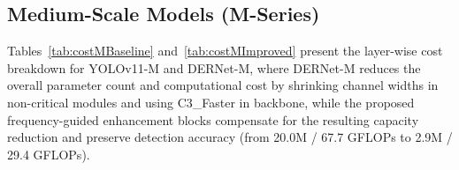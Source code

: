 \documentclass{article}
\theoremstyle{plain}
\theoremstyle{definition}
\theoremstyle{remark}
\begin{document}
\begin{table}[h!]
\centering
\caption{Cost breakdown for substituted/inserted modules in DERNet-S.}
\label{tab:costSImproved}
\vspace{0.1cm}
\end{table}

\subsection{Medium-Scale Models (M-Series)}

Tables~\ref{tab:costMBaseline} and~\ref{tab:costMImproved} present the layer-wise cost breakdown for YOLOv11-M and DERNet-M, where DERNet-M reduces the overall parameter count and computational cost by shrinking channel widths in non-critical modules and using C3\_Faster in backbone, while the proposed frequency-guided enhancement blocks compensate for the resulting capacity reduction and preserve detection accuracy (from 20.0M / 67.7 GFLOPs to 2.9M / 29.4 GFLOPs).
\end{document}
